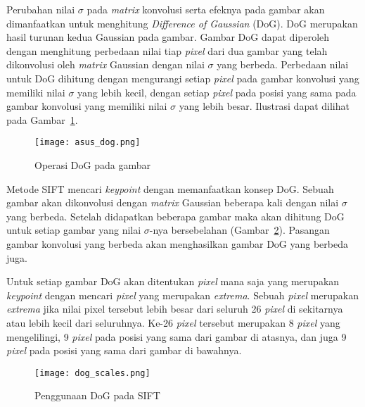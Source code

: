 Perubahan nilai $\sigma$ pada \textit{matrix} konvolusi serta efeknya pada gambar akan dimanfaatkan untuk menghitung \textit{Difference of Gaussian} (DoG). DoG merupakan hasil turunan kedua Gaussian pada gambar. Gambar DoG dapat diperoleh dengan menghitung perbedaan nilai tiap \textit{pixel} dari dua gambar yang telah dikonvolusi oleh \textit{matrix} Gaussian dengan nilai $\sigma$ yang berbeda. Perbedaan nilai untuk DoG dihitung dengan mengurangi setiap \textit{pixel} pada gambar konvolusi yang memiliki nilai $\sigma$ yang lebih kecil, dengan setiap \textit{pixel} pada posisi yang sama pada gambar konvolusi yang memiliki nilai $\sigma$ yang lebih besar. Ilustrasi dapat dilihat pada Gambar~\ref{fig:dog_asus}. 
\begin{figure}[H]
	\centering
	\texttt{[image: asus\_dog.png]}
	\caption{Operasi DoG pada gambar}
	\label{fig:dog_asus}
\end{figure} 

Metode SIFT mencari \textit{keypoint} dengan memanfaatkan konsep DoG. Sebuah gambar akan dikonvolusi dengan \textit{matrix} Gaussian beberapa kali dengan nilai $\sigma$ yang berbeda. Setelah didapatkan beberapa gambar maka akan dihitung DoG untuk setiap gambar yang nilai $\sigma$-nya bersebelahan (Gambar~\ref{fig:dog_scales}). Pasangan gambar konvolusi yang berbeda akan menghasilkan gambar DoG yang berbeda juga.  

Untuk setiap gambar DoG akan ditentukan \textit{pixel} mana saja yang merupakan \textit{keypoint} dengan mencari \textit{pixel} yang merupakan \textit{extrema}. Sebuah \textit{pixel} merupakan \textit{extrema} jika nilai pixel tersebut lebih besar dari seluruh 26 \textit{pixel} di sekitarnya atau lebih kecil dari seluruhnya. Ke-26 \textit{pixel} tersebut merupakan 8 \textit{pixel} yang mengelilingi, 9 \textit{pixel} pada posisi yang sama dari gambar di atasnya, dan juga 9 \textit{pixel} pada posisi yang sama dari gambar di bawahnya.
\begin{figure}[H]
	\centering
	\texttt{[image: dog\_scales.png]}
	\caption{Penggunaan DoG pada SIFT}
	\label{fig:dog_scales}
\end{figure} 

\newpage
